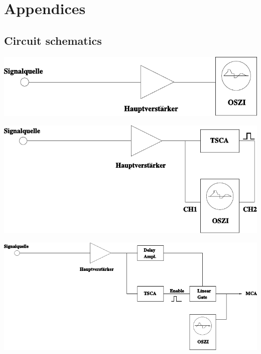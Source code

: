 \section{Appendices}
%
\subsection{Circuit schematics}
%
\begin{center}
    \begin{adjustbox}{max width=\linewidth, keepaspectratio}
        \includegraphics[]{pdf/Schaltung1}
    \end{adjustbox}
    \label{fig:Schaltung1}
\end{center}
%
\begin{center}
    \begin{adjustbox}{max width=\linewidth, keepaspectratio}
        \includegraphics[]{pdf/Schaltung2}
    \end{adjustbox}
    \label{fig:Schaltung2}
\end{center}
%
\begin{center}
    \begin{adjustbox}{max width=\linewidth, keepaspectratio}
        \includegraphics[]{pdf/Schaltung3}
    \end{adjustbox}
    \label{fig:Schaltung3}
\end{center}
